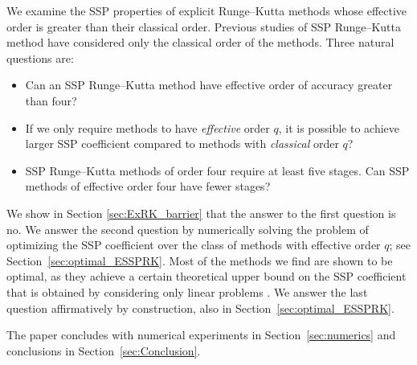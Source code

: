 We examine the SSP properties of explicit Runge--Kutta methods whose
effective order is greater than their classical order.
Previous studies of SSP Runge--Kutta method have considered only the
classical order of the methods.
Three natural questions are:
\begin{itemize}
    \item Can an SSP Runge--Kutta method have effective order of accuracy greater than four?
    \item If we only require methods to have {\em effective} order $q$, it is possible to achieve larger
            SSP coefficient compared to methods with {\em classical} order $q$?
    \item SSP Runge--Kutta methods of order four require at least five stages.  Can SSP methods of 
          effective order four have fewer stages?
          
\end{itemize}
We show in Section \ref{sec:ExRK_barrier} that the answer to the first question is no.
We answer the second question by numerically solving the problem of optimizing
the SSP coefficient over the class of methods with effective order $q$;
see Section~\ref{sec:optimal_ESSPRK}.  
Most of the methods we find are shown to be optimal, as they achieve a certain theoretical
upper bound on the SSP coefficient that is obtained by considering only
linear problems \cite{Kraaijevanger1986}.
We answer the last question affirmatively
by construction, also in Section~\ref{sec:optimal_ESSPRK}.

The paper concludes with numerical experiments in
Section~\ref{sec:numerics} and conclusions in
Section~\ref{sec:Conclusion}.
